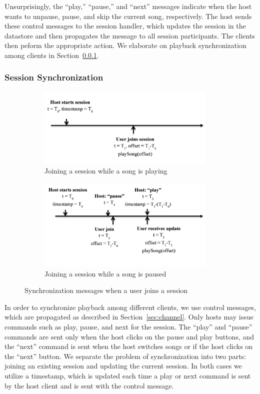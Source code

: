 Unsurprisingly, the ``play,'' ``pause,'' and ``next'' messages 
indicate when the host wants to unpause, pause, and skip the current song, respectively.
The host sends these control messages to the session handler, which updates
the session in the datastore and then propagates the message to all session
participants. The clients then peform the appropriate action. We elaborate on
playback synchronization among clients in Section~\ref{sec:sync}.

\subsubsection{Session Synchronization}
\label{sec:sync}

\begin{figure}[t!]
	\centering
	\begin{subfigure}[b]{0.5\textwidth}
		\centering
		\includegraphics[width=85mm]{joinSessionPlay.png}
		\caption{Joining a session while a song is playing}
		\label{fig:syncJoinPlay}
	\end{subfigure}
	
	\begin{subfigure}[b]{0.5\textwidth}
		\centering
		\includegraphics[width=85mm]{joinSessionPause.png}
		\caption{Joining a session while a song is paused}
		\label{fig:syncJoinPause}
	\end{subfigure}
	\caption{Synchronization messages when a user joins a session}
	\label{fig:syncJoin}
\end{figure}

In order to synchronize playback among different clients, we use 
control messages, which are propagated as described in Section~\ref{sec:channel}. 
Only hosts may issue commands such as play, pause, and 
next for the session. The ``play'' and ``pause'' commands are sent
only when the host clicks on the pause and play buttons, and the 
``next'' command is sent when the host switches songs or if the
host clicks on the ``next'' button. We separate the problem of synchronization 
into two parts: joining an existing session and updating the
current session. In both cases we utilize a timestamp, which is 
updated each time a play or next command is sent by the host client
and is sent with the control message. 

